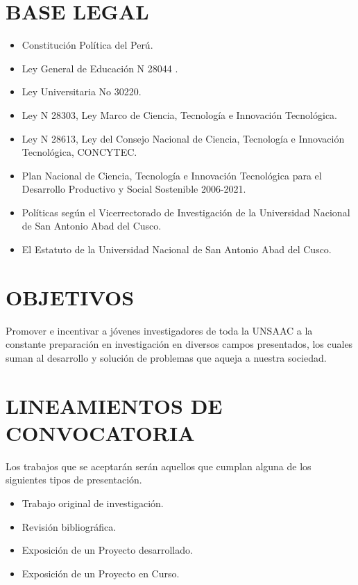 \documentclass{article}
\begin{document}
\section{BASE LEGAL}

\begin{itemize}
\item Constitución Política del Perú.
\item Ley General de Educación N 28044 .
\item Ley Universitaria No 30220.
\item Ley N 28303, Ley Marco de Ciencia, Tecnología e Innovación Tecnológica.
\item Ley N 28613, Ley del Consejo Nacional de Ciencia, Tecnología e Innovación 
Tecnológica, CONCYTEC.
\item Plan Nacional de Ciencia, Tecnología e Innovación Tecnológica para el Desarrollo 
Productivo y Social Sostenible 2006-2021.
\item Políticas según el Vicerrectorado de Investigación de la Universidad Nacional de San Antonio Abad del Cusco.
\item El Estatuto de la Universidad Nacional de San Antonio Abad del Cusco.
\end{itemize}

\section{OBJETIVOS}

Promover e incentivar a jóvenes investigadores de toda la UNSAAC a la constante preparación en investigación en diversos campos presentados, los cuales suman al desarrollo y solución de problemas que aqueja a nuestra sociedad.

\section{LINEAMIENTOS DE CONVOCATORIA}

Los trabajos que se aceptarán serán aquellos que cumplan alguna de los siguientes tipos de presentación.

\begin{itemize}
\item Trabajo original de investigación.
\item Revisión bibliográfica.
\item Exposición de un Proyecto desarrollado.
\item Exposición de un Proyecto en Curso.
\end{itemize}
\end{document}
